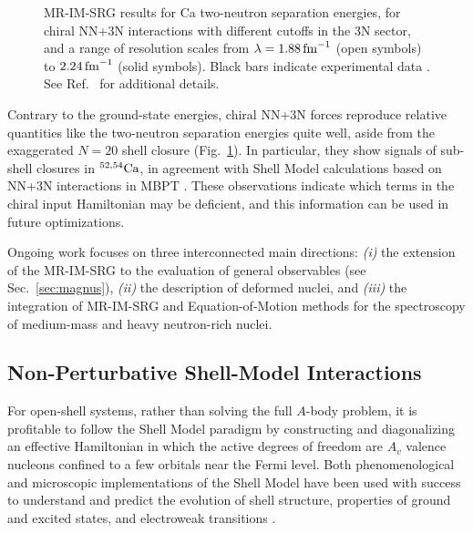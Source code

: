 \begin{figure}[t]
  \setlength{\unitlength}{0.72\textwidth}
  \begin{center}
  \end{center}
  \vspace{-30pt}
  \caption{\label{fig:mrimsrg_CaXX} 
    MR-IM-SRG results for Ca two-neutron separation energies, 
    for chiral NN+3N interactions 
    with different cutoffs in the 3N sector, and a range of resolution scales 
    from $\lambda=1.88\fmi$ (open symbols) to $2.24\fmi$ (solid symbols).
    Black bars indicate experimental data \cite{Wang:2012uq,Wienholtz:2013bh}.
    See Ref.~\cite{Hergert:2014vn} for additional details. 
    }
\end{figure}

Contrary to the ground-state energies, chiral NN+3N forces reproduce
relative quantities like the two-neutron separation energies quite
well, aside from the exaggerated $N=20$ shell closure
(Fig.~\ref{fig:mrimsrg_CaXX}).  In particular, they show signals of
sub-shell closures in $\nuc{Ca}{52,54}$, in agreement with
Shell Model calculations based on NN+3N interactions in MBPT
\cite{Holt:2014vn,Wienholtz:2013bh}. These observations indicate which
terms in the chiral input Hamiltonian may be deficient, and this
information can be used in future optimizations.

Ongoing work focuses on three interconnected main directions:
\emph{(i)} the extension of the MR-IM-SRG to the evaluation of general
observables (see Sec.~\ref{sec:magnus}), \emph{(ii)} the description
of deformed nuclei, and \emph{(iii)} the integration of MR-IM-SRG and
Equation-of-Motion methods \cite{Rowe:1968eq} for the spectroscopy of
medium-mass and heavy neutron-rich nuclei.

\subsection{Non-Perturbative Shell-Model Interactions}
\label{sec:shell_model}

For open-shell systems, rather than solving the full $A$-body problem,
it is profitable to follow the Shell Model paradigm by constructing
and diagonalizing an effective Hamiltonian in which the active degrees
of freedom are $A_v$ valence nucleons confined to a few orbitals near
the Fermi level. Both phenomenological and microscopic
implementations of the Shell Model have been used with success to
understand and predict the evolution of shell structure, properties of
ground and excited states, and electroweak transitions
\cite{Brown:2001rg,Caurier:2005qf,Otsuka:2013vn}.

